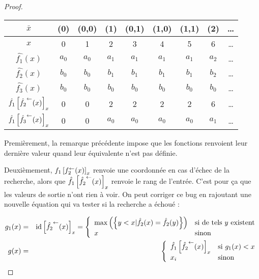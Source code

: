 \begin{proof}
		\espace 
		
		\begin{center}
			\begin{tabular}{|c|cccccccc|}
				\hline
				$\bar{x}$			& (0)	& (0,0)	& (1)	& (0,1)	& (1,0)	& (1,1)	& (2)	& \dots \\
				\hline
				$x$					& 0 	& 1	 	& 2		& 3 	& 4 	& 5 	& 6 	& \dots \\
				\hline 
				$\hat{f_1}(x)$
									& $a_0$	& $a_0$	& $a_1$	& $a_1$	& $a_1$	& $a_1$	& $a_2$	& \dots \\
				$\hat{f_2}(x)$ 		
									& $b_0$	& $b_0$	& $b_1$	& $b_1$	& $b_1$	& $b_1$	& $b_2$	& \dots \\
				$\hat{f_3}(x)$ 		
									& $b_0$	& $b_0$	& $b_0$	& $b_0$	& $b_0$	& $b_0$	& $b_0$	& \dots \\
				$\hat{f_1}\left[ \hat{f_2}^{\leftarrow}(x) \right]_{x}$
									& 0		& 0		& 2		& 2		& 2		& 2		& 6		& \dots \\
				$\hat{f_1}\left[ \hat{f_3}^{\leftarrow}(x) \right]_{x}$
									& 0		& 0		& $a_0$ & $a_0$	& $a_0$	& $a_0$	& $a_1$	& \dots \\
				\hline
			\end{tabular}
		\end{center}
		
		Premièrement, la remarque précédente impose que les fonctions renvoient leur dernière valeur quand leur équivalente n'est pas définie. 
		
		Deuxièmement, $f_1\left[ f_2^{\leftarrow}(x) \right]_{x}$ renvoie une coordonnée en cas d'échec de la recherche, alors que $\hat{f_1}\left[ \hat{f_2}^{\leftarrow}(x) \right]_{x}$ renvoie le rang de l'entrée. C'est pour ça que les valeurs de sortie n'ont rien à voir. On peut corriger ce bug en rajoutant une nouvelle équation qui va tester si la recherche a échoué :
		
		\begin{eqnarray}
			g_1(x) 	& = 	& \text{id}\left[ \hat{f_2}^{\leftarrow}(x) \right]_{x} = \left\lbrace \begin{array}{ll} 
																		\max\left( \left\lbrace y<x | \hat{f_2}(x) = \hat{f_2}(y) \right\rbrace \right) & \text{si de tels $y$ existent}\\
																		x		& \text{sinon}
																		 \end{array} \right. \\
			g(x) & = & \left\lbrace \begin{array}{ll} 
							\hat{f_1}\left[ \hat{f_2}^{\leftarrow}(x) \right]_{x} & \text{si $g_1(x) < x$}\\
							x_i		& \text{sinon}
							 \end{array} \right.
		\end{eqnarray}
		

\end{proof}
